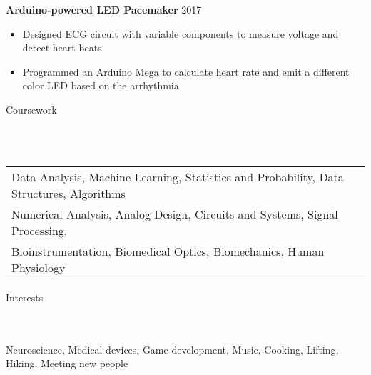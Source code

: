 \documentclass{article}
\newcommand{\lineunder} {
    \vspace*{-8pt} \\
    \hspace*{-18pt} \hrulefill \\
}
\newcommand{\header} [1] {
    {\hspace*{-18pt}\vspace*{6pt} \Large{#1} }
    \vspace*{-6pt} 
    \lineunder
}
\begin{document}
\textbf{Arduino-powered LED Pacemaker} \hfill 2017
\vspace{-2mm}
\begin{itemize} \itemsep 0.05pt
	\item Designed ECG circuit with variable components to measure voltage and detect heart beats
	\item Programmed an Arduino Mega to calculate heart rate and emit a different color LED based on the arrhythmia
\end{itemize}

\header{Coursework}
\vspace{1mm}
\begin{tabular}{ l l }
	Data Analysis, Machine Learning, Statistics and Probability, Data Structures, Algorithms \\
	Numerical Analysis, Analog Design, Circuits and Systems, Signal Processing, \\
	Bioinstrumentation, Biomedical Optics, Biomechanics, Human Physiology
\end{tabular}

\header{Interests}
Neuroscience, Medical devices, Game development, Music, Cooking, Lifting, Hiking, Meeting new people
\ 
\end{document}
